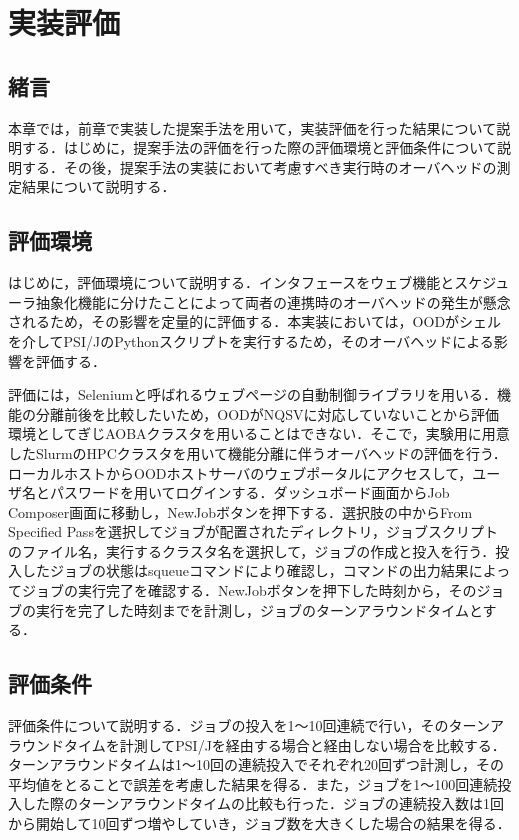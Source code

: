 \section{実装評価}
\subsection{緒言}
本章では，前章で実装した提案手法を用いて，実装評価を行った結果について説明する．はじめに，提案手法の評価を行った際の評価環境と評価条件について説明する．その後，提案手法の実装において考慮すべき実行時のオーバヘッドの測定結果について説明する．\par

\subsection{評価環境}
はじめに，評価環境について説明する．インタフェースをウェブ機能とスケジューラ抽象化機能に分けたことによって両者の連携時のオーバヘッドの発生が懸念されるため，その影響を定量的に評価する．本実装においては，OODがシェルを介してPSI/JのPythonスクリプトを実行するため，そのオーバヘッドによる影響を評価する．\par
評価には，Selenium\cite{cite6}と呼ばれるウェブページの自動制御ライブラリを用いる．機能の分離前後を比較したいため，OODがNQSVに対応していないことから評価環境としてぎじAOBAクラスタを用いることはできない．そこで，実験用に用意したSlurmのHPCクラスタを用いて機能分離に伴うオーバヘッドの評価を行う．ローカルホストからOODホストサーバのウェブポータルにアクセスして，ユーザ名とパスワードを用いてログインする．ダッシュボード画面からJob Composer画面に移動し，NewJobボタンを押下する．選択肢の中からFrom Specified Passを選択してジョブが配置されたディレクトリ，ジョブスクリプトのファイル名，実行するクラスタ名を選択して，ジョブの作成と投入を行う．投入したジョブの状態はsqueueコマンドにより確認し，コマンドの出力結果によってジョブの実行完了を確認する．NewJobボタンを押下した時刻から，そのジョブの実行を完了した時刻までを計測し，ジョブのターンアラウンドタイムとする．\par

\subsection{評価条件}
評価条件について説明する．ジョブの投入を1～10回連続で行い，そのターンアラウンドタイムを計測してPSI/Jを経由する場合と経由しない場合を比較する．ターンアラウンドタイムは1～10回の連続投入でそれぞれ20回ずつ計測し，その平均値をとることで誤差を考慮した結果を得る．また，ジョブを1～100回連続投入した際のターンアラウンドタイムの比較も行った．ジョブの連続投入数は1回から開始して10回ずつ増やしていき，ジョブ数を大きくした場合の結果を得る．\par


